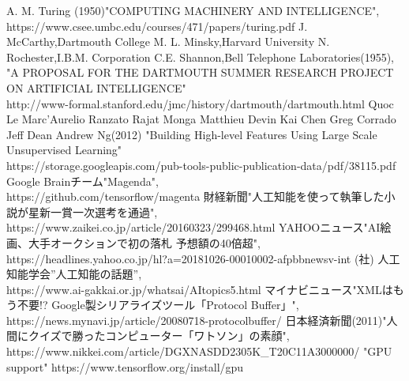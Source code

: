 \documentclass[12pt]{jreport}
\begin{document}
\begin{thebibliography}{99}%



A. M. Turing (1950)"COMPUTING MACHINERY AND INTELLIGENCE",\\
https://www.csee.umbc.edu/courses/471/papers/turing.pdf
J. McCarthy,Dartmouth College M. L. Minsky,Harvard University N.\\
Rochester,I.B.M. Corporation C.E. Shannon,Bell Telephone Laboratories(1955),
"A PROPOSAL FOR THE DARTMOUTH SUMMER RESEARCH PROJECT ON ARTIFICIAL INTELLIGENCE"\\
http://www-formal.stanford.edu/jmc/history/dartmouth/dartmouth.html
Quoc Le Marc'Aurelio Ranzato Rajat Monga Matthieu Devin Kai Chen Greg Corrado Jeff Dean Andrew Ng(2012)
"Building High-level Features Using Large Scale Unsupervised Learning"\\
https://storage.googleapis.com/pub-tools-public-publication-data/pdf/38115.pdf
Google Brainチーム"Magenda",\\
https://github.com/tensorflow/magenta
財経新聞"人工知能を使って執筆した小説が星新一賞一次選考を通過",\\
https://www.zaikei.co.jp/article/20160323/299468.html
YAHOOニュース"AI絵画、大手オークションで初の落札 予想額の40倍超",\\
https://headlines.yahoo.co.jp/hl?a=20181026-00010002-afpbbnewsv-int
(社) 人工知能学会”人工知能の話題”,\\
https://www.ai-gakkai.or.jp/whatsai/AItopics5.html
マイナビニュース"XMLはもう不要!? Google製シリアライズツール「Protocol Buffer」",\\
https://news.mynavi.jp/article/20080718-protocolbuffer/
日本経済新聞(2011)"人間にクイズで勝ったコンピューター「ワトソン」の素顔",\\
https://www.nikkei.com/article/DGXNASDD2305K\_T20C11A3000000/
"GPU support"
https://www.tensorflow.org/install/gpu
\end{thebibliography}

\end{document}
